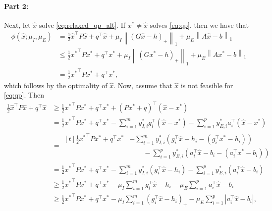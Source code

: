 \documentclass{article} %
\newcommand{\norm}[1]{\left\lVert#1\right\rVert}
\begin{document}
\paragraph{Part 2:} Next, let $\hat{x}$ solve \cref{eq:relaxed_qp_alt}. If $x^* \neq \hat{x}$ solves \cref{eq:qp}, then we have that
\begin{subequations}
\begin{align}
    \phi(\hat{x}; \mu_I, \mu_E) &= \frac{1}{2} \hat{x}^\top P \hat{x} + q^\top \hat{x} + \mu_I \norm{(G\hat{x} - h)_+}_1 + \mu_E \norm{A\hat{x} - b}_1 \\
    &\leq \frac{1}{2} {x^*}^\top P x^* + q^\top x^* + \mu_I \norm{(Gx^* - h)_+}_1 + \mu_E \norm{Ax^* - b}_1 \\
    &= \frac{1}{2} {x^*}^\top P x^* + q^\top x^*, \label{eq:xhat_minimizes_penalty_function}
\end{align}
\end{subequations}
which follows by the optimality of $\hat{x}$.
Now, assume that $\hat{x}$ is not feasible for \cref{eq:qp}. Then
\begin{subequations}
\begin{align}
    \frac{1}{2} \hat{x}^\top P \hat{x} + q^\top \hat{x} &\geq \frac{1}{2} {x^*}^\top P x^* + q^\top x^* + (Px^* + q)^\top (\hat{x} - x^*) \\
    &= \frac{1}{2} {x^*}^\top P x^* + q^\top x^* - \sum_{i = 1}^m y_{I,i}^* g_i^\top(\hat{x} - x^*) - \sum_{i = 1}^p y_{E,i}^* a_i^\top(\hat{x} - x^*) \\
    &= \begin{aligned}[t]
        \frac{1}{2} {x^*}^\top P x^* + q^\top x^* & - \sum_{i = 1}^m y_{I,i}^* (g_i^\top \hat{x} - h_i - (g_i^\top x^* - h_i)) \\
        & \hspace{2em} - \sum_{i = 1}^p y_{E,i}^* (a_i^\top \hat{x} - b_i - (a_i^\top x^* - b_i))
    \end{aligned} \\
    &= \frac{1}{2} {x^*}^\top P x^* + q^\top x^* - \sum_{i = 1}^m y_{I,i}^* (g_i^\top \hat{x} - h_i) - \sum_{i = 1}^p y_{E,i}^* (a_i^\top \hat{x} - b_i) \\
    &\geq \frac{1}{2} {x^*}^\top P x^* + q^\top x^* - \mu_I \sum_{i = 1}^m g_i^\top \hat{x} - h_i - \mu_E \sum_{i = 1}^p a_i^\top \hat{x} - b_i \\
    &\geq \frac{1}{2} {x^*}^\top P x^* + q^\top x^* - \mu_I \sum_{i = 1}^m (g_i^\top \hat{x} - h_i)_+ - \mu_E \sum_{i = 1}^p |a_i^\top \hat{x} - b_i|,
\end{align}
\end{subequations}
\end{document}

